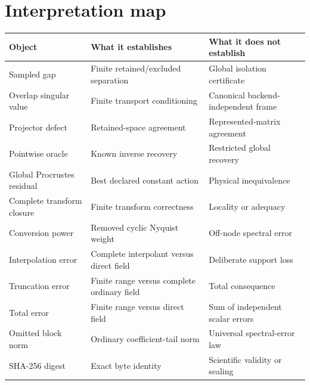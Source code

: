 \documentclass[11pt]{article}
\begin{document}
\section{Interpretation map}

\begin{center}
\begin{tabular}{L{0.24\textwidth}L{0.31\textwidth}L{0.35\textwidth}}
\toprule
Object & What it establishes & What it does not establish \\
\midrule
Sampled gap & Finite retained/excluded separation & Global isolation certificate \\
Overlap singular value & Finite transport conditioning & Canonical backend-independent frame \\
Projector defect & Retained-space agreement & Represented-matrix agreement \\
Pointwise oracle & Known inverse recovery & Restricted global recovery \\
Global Procrustes residual & Best declared constant action & Physical inequivalence \\
Complete transform closure & Finite transform correctness & Locality or adequacy \\
Conversion power & Removed cyclic Nyquist weight & Off-node spectral error \\
Interpolation error & Complete interpolant versus direct field & Deliberate support loss \\
Truncation error & Finite range versus complete ordinary field & Total consequence \\
Total error & Finite range versus direct field & Sum of independent scalar errors \\
Omitted block norm & Ordinary coefficient-tail norm & Universal spectral-error law \\
SHA-256 digest & Exact byte identity & Scientific validity or sealing \\
\bottomrule
\end{tabular}
\end{center}

\footnotesize


\end{document}
